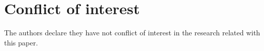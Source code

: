 \IfFileExists{aims.cls}{\documentclass{aims}}{\documentclass[11pt]{article}}
\numberwithin{equation}{section}
\theoremstyle{thmstyleone}%
\theoremstyle{thmstyletwo}%
\theoremstyle{thmstylethree}%
\begin{document}







\section*{Conflict of interest}
 The authors declare they have not conflict of interest in the research related with this paper.
 
\end{document}
